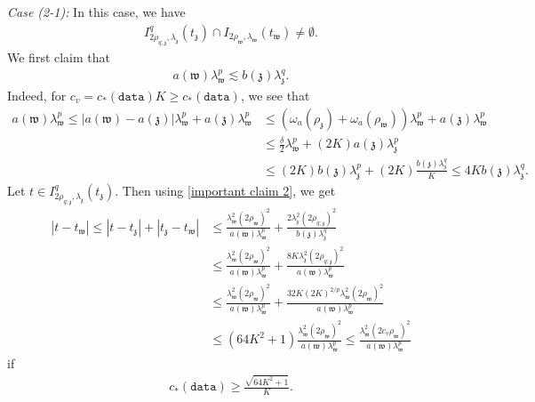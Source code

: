 \documentclass[11pt,oneside, english,reqno,twoside a4paper]{amsart}
\theoremstyle{definition}
\numberwithin{theorem}{section}
\numberwithin{equation}{section}
\newcommand{\mfz}{\mathfrak{z}}
\newcommand{\mfw}{\mathfrak{w}}
\newcommand{\apprle}{\lesssim}
\begin{document}
\noindent \textit{Case (2-1):} In this case, we have
\begin{align*}
 I^q_{2\rho_{q;\mathfrak{z}}, \lambda_{\mathfrak{z}}}(t_{\mathfrak{z}})\cap I_{2\rho_{ \mathfrak{w}}, \lambda_{\mathfrak{w}}}(t_{\mathfrak{w}})\neq \emptyset.   
\end{align*}
We first claim that
\begin{align}\label{important claim 2}
    a(\mfw)\lambda^p_{\mfw}\apprle b(\mfz)\lambda^q_{\mfz}.
\end{align}
Indeed, for $c_v=c_*(\texttt{data})K\geq c_*(\texttt{data})$, we see that
\begin{align*}
    a(\mfw)\lambda^p_{\mfw}\leq |a(\mfw)-a(\mfz)|\lambda^p_{\mfw}+a(\mfz)\lambda^p_{\mfw}&\leq \left(\omega_a(\rho_{\mfz})+\omega_a(\rho_{\mfw})\right)\lambda^p_{\mfw}+a(\mfz)\lambda^p_{\mfw}\\
    &\leq\frac{\delta}{2}\lambda^p_{\mfw}+(2K)a(\mfz)\lambda^p_{\mfz}\\
    &\leq (2K)b(\mfz)\lambda^p_{\mfz}+(2K)\frac{b(\mfz)\lambda^q_{\mfz}}{K}\leq 4K b(\mfz)\lambda^q_{\mfz}.
\end{align*}
Let $t \in I^q_{2\rho_{q;\mathfrak{z}}, \lambda_{\mathfrak{z}}}(t_{\mathfrak{z}}).$ Then using \eqref{important claim 2}, we get
\begin{align*}
    |t-t_{\mathfrak{w}}|\leq |t-t_{\mathfrak{z}}|+|t_{\mathfrak{z}}-t_{\mathfrak{w}}|&\leq \frac{\lambda^{2}_{\mathfrak{w}}(2\rho_{\mathfrak{w}})^2}{a(\mathfrak{w})\lambda^p_{\mfw}}+\frac{2\lambda^{2}_{\mathfrak{z}}(2\rho_{q;\mathfrak{z}})^2}{b(\mathfrak{z})\lambda^q_{\mfz}}\\
    &\leq \frac{\lambda^{2}_{\mathfrak{w}}(2\rho_{\mathfrak{w}})^2}{a(\mathfrak{w})\lambda^p_{\mfw}}+\frac{8K\lambda^2_{\mfz}(2\rho_{q;\mfz})^2}{a(\mfw)\lambda^p_{\mfw}}\\
    &\leq \frac{\lambda^{2}_{\mathfrak{w}}(2\rho_{\mathfrak{w}})^2}{a(\mathfrak{w})\lambda^p_{\mfw}}+ \frac{32K (2K)^{2/p}\lambda^2_{\mfw}(2\rho_{\mfw})^2}{a(\mfw)\lambda^p_{\mfw}}\\
    &\leq \left(64K^2+1\right)\frac{\lambda^{2}_{\mathfrak{w}}(2\rho_{\mathfrak{w}})^2}{a(\mathfrak{w})\lambda^p_{\mfw}}\leq \frac{\lambda^{2}_{\mathfrak{w}}(2c_v\rho_{\mathfrak{w}})^2}{a(\mathfrak{w})\lambda^p_{\mfw}}
\end{align*}
if
\begin{align}\label{c_4}
    c_*(\texttt{data})\geq \frac{\sqrt{64K^2+1}}{K}.
\end{align}
\end{document}

